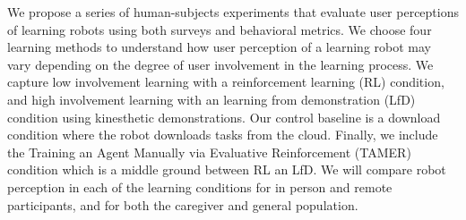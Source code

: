 \documentclass[letterpaper]{article} %
\begin{document}
We propose a series of human-subjects experiments that evaluate user perceptions of learning robots using both surveys and behavioral metrics. %
We choose four learning methods to understand how user perception of a learning robot may vary depending on the degree of user involvement in the learning process. We capture low involvement learning with a reinforcement learning (RL) condition, and high involvement learning with an learning from demonstration (LfD) condition using kinesthetic demonstrations. Our control baseline is a download condition where the robot downloads tasks from the cloud. Finally, we include the Training an Agent Manually via Evaluative Reinforcement (TAMER) \cite{knox2009interactively} condition which is a middle ground between RL an LfD. %
We will compare robot perception in each of the learning conditions for in person and remote participants, and for both the caregiver and general population. 
\end{document}

